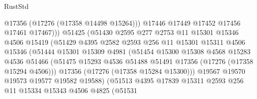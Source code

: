 \begin{lexlean}{RustStd}
\begin{coremodule}
                                  @17356
                                  (@17276 (@17358 @14498 @15264)))
                                @17446
                                @17449
                                @17452
                                @17456
                                @17461
                                @17467)))
                          @51425
                          (@51430
                            @2595
                            @277
                            @2753
                            @11
                            @15301
                            @15346
                            @4506
                            @15419
                            (@51429
                              @4395
                              @2582
                              @2593
                              @256
                              @11
                              @15301
                              @15311
                              @4506
                              @15346
                              (@51444
                                @15301
                                @15309
                                @4981
                                (@51454
                                  @15300
                                  @15308
                                  @4568
                                  @15283
                                  @4536
                                  @51466
                                  (@51475
                                    @15293
                                    @4536
                                    @51488
                                    @51491
                                    @17356
                                    (@17276 (@17358 @15294 @4506)))
                                  @17356
                                  (@17276 (@17358 @15284 @15300)))
                                @19567
                                @19570
                                @19573
                                @19577
                                @19582
                                @19588)
                              (@51513
                                @4395
                                @17839
                                @15311
                                @2593
                                @256
                                @11
                                @15334
                                @15343
                                @4506
                                @4825
                                (@51531

\end{coremodule}
\end{lexlean}
